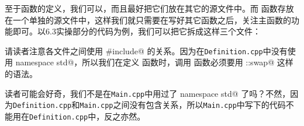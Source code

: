 至于函数的定义，我们可以，而且最好把它们放在其它的源文件中。而 \lstinline@main@ 函数存放在一个单独的源文件中，这样我们就只需要在写好其它函数之后，关注主函数的功能即可。以6.3实操部分的代码为例，我们可以把它拆成这样三个文件：



请读者注意各文件之间使用 \lstinline@#include@ 的关系。因为在\texttt{Definition.cpp}中没有使用 \lstinline@using namespace std@，所以我们在定义 \lstinline@transfer@ 函数时，调用 \lstinline@swap@ 函数必须要用 \lstinline@std::swap@ 这样的语法。\par
读者可能会好奇，我们不是在\texttt{Main.cpp}中用过了 \lstinline@using namespace std@ 了吗？不然，因为\texttt{Definition.cpp}和\texttt{Main.cpp}之间没有包含关系，所以\texttt{Main.cpp}中写下的代码不能用在\texttt{Definition.cpp}中，反之亦然。\par
